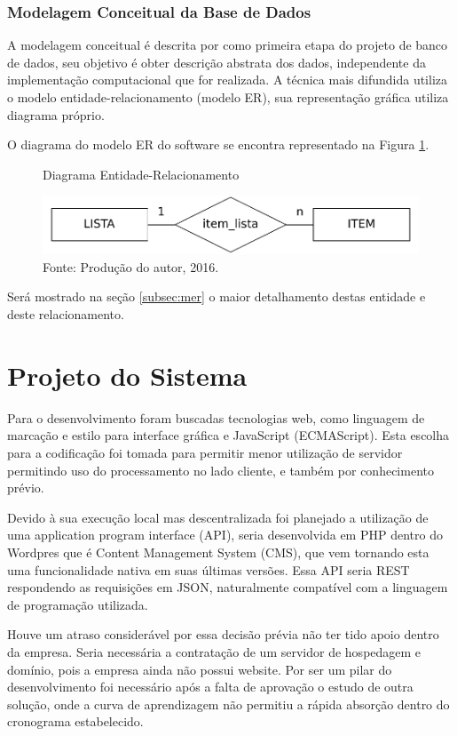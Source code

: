 \documentclass[
	12pt,
	openright,
	oneside, %
	a4paper,
	chapter=TITLE,
	section=TITLE,
	english,
	brazil %
	]{abntex2-udesc}
\begin{document}
\subsubsection{Modelagem Conceitual da Base de Dados}

A modelagem conceitual é descrita por  como primeira etapa do projeto de banco de dados, seu objetivo é obter descrição abstrata dos dados, independente da implementação computacional que for realizada. A técnica mais difundida utiliza o modelo entidade-relacionamento (modelo ER), sua representação gráfica utiliza diagrama próprio.

O diagrama do modelo ER do software se encontra representado na Figura \ref{fig:me}.

\begin{figure}[h]
\caption{Diagrama Entidade-Relacionamento}\label{fig:me}
\centering
\includegraphics{figures/mer.pdf}
\caption*{\footnotesize Fonte: Produção do autor, 2016.}
\end{figure}

Será mostrado na seção \ref{subsec:mer} o maior detalhamento destas entidade e deste relacionamento.

\section{Projeto do Sistema}

Para o desenvolvimento foram buscadas tecnologias web, como linguagem de marcação e estilo para interface gráfica e JavaScript (ECMAScript). Esta escolha para a codificação foi tomada para permitir menor utilização de servidor permitindo uso do processamento no lado cliente, e também por conhecimento prévio.

Devido à sua execução local mas descentralizada foi planejado a utilização de uma application program interface (API), seria desenvolvida em PHP dentro do Wordpres que é Content Management System (CMS), que vem tornando esta uma funcionalidade nativa em suas últimas versões. Essa API seria REST respondendo as requisições em JSON, naturalmente compatível com a linguagem de programação utilizada.

Houve um atraso considerável por essa decisão prévia não ter tido apoio dentro da empresa. Seria necessária a contratação de um servidor de hospedagem e domínio, pois a empresa ainda não possui website. Por ser um pilar do desenvolvimento foi necessário após a falta de aprovação o estudo de outra solução, onde a curva de aprendizagem não permitiu a rápida absorção dentro do cronograma estabelecido.
\end{document}
